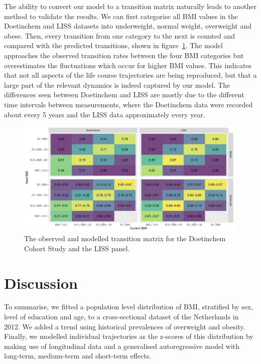 \documentclass{imammb}
\numberwithin{equation}{section}
\begin{document}
The ability to convert our model to a transition matrix naturally leads to another method to validate the results. We can first categorise all BMI values in the Doetinchem and LISS datasets into underweight, normal weight, overweight and obese. Then, every transition from one category to the next is counted and compared with the predicted transitions, shown in figure~\ref{fig:Transition Matrices}. The model approaches the observed transition rates between the four BMI categories but overestimates the fluctuations which occur for higher BMI values. This indicates that not all aspects of the life course trajectories are being reproduced, but that a large part of the relevant dynamics is indeed captured by our model. The differences seen between Doetinchem and LISS are mostly due to the different time intervals between measurements, where the Doetinchem data were recorded about every 5 years and the LISS data approximately every year.

\vspace{-5mm}

\begin{figure}[!h]
\centering\includegraphics[width=0.99\textwidth] {"Figures/Transition-Matrices.pdf"}
\vspace{-2mm}
\caption{The observed and modelled transition matrix for the Doetinchem Cohort Study and the LISS panel.}
\label{fig:Transition Matrices}
\vspace*{-9pt}
\end{figure}

\vspace{-2mm}

\section{Discussion}
\label{sec:Discussion}

To summarise, we fitted a population level distribution of BMI, stratified by sex, level of education and age, to a cross-sectional dataset of the Netherlands in 2012. We added a trend using historical prevalences of overweight and obesity. Finally, we modelled individual trajectories as the z-scores of this distribution by making use of longitudinal data and a generalised autoregressive model with long-term, medium-term and short-term effects.
\end{document}
